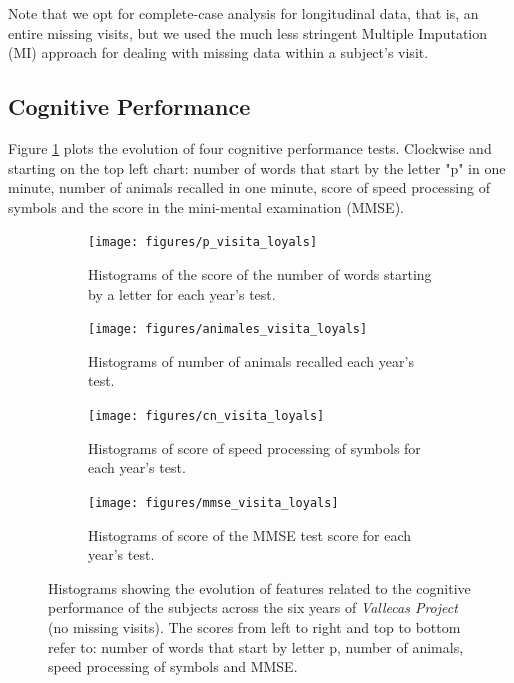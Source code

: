 \documentclass[11pt]{article}
\theoremstyle{definition}
\theoremstyle{remark}
\begin{document}
Note that we opt for complete-case analysis for longitudinal data, that is, an entire missing visits, but 
we used the much less stringent Multiple Imputation (MI) \cite{buuren2010mice} approach for dealing with missing data within a subject's visit.

\subsection{Cognitive Performance}
\label{sse:cogper}
Figure \ref{fig:cogperyears} plots the evolution of four cognitive performance tests. Clockwise and starting on  the top left chart: number of words that start by the letter "p" in one minute, number of animals recalled in one minute, score of speed processing of symbols and the score in the mini-mental examination (MMSE).

\begin{figure}[H]
    \centering
    \begin{subfigure}[t]{0.4\textwidth}
        \centering
        \texttt{[image: figures/p\_visita\_loyals]}
        \caption{Histograms of the score of the number of words starting by a letter for each year's test.}
    \end{subfigure}
    \hfill
    \begin{subfigure}[t]{0.4\textwidth}
        \centering
        \texttt{[image: figures/animales\_visita\_loyals]}
        \caption{Histograms of number of animals recalled each year's test.}
    \end{subfigure}%
    
     \begin{subfigure}[t]{0.4\textwidth}
        \centering
        \texttt{[image: figures/cn\_visita\_loyals]}
        \caption{Histograms of score of speed processing of symbols for each year's test.}
    \end{subfigure}
    \hfill
    \begin{subfigure}[t]{0.4\textwidth}
        \centering
        \texttt{[image: figures/mmse\_visita\_loyals]}
        \caption{Histograms of score of the MMSE test score for each year's test.}
    \end{subfigure}%
    \caption{Histograms showing the evolution of features related to the cognitive performance of the subjects across the six years of \emph{Vallecas Project} (no missing visits). The scores from left to right and top to bottom refer to: number of words that start by letter p, number of animals, speed processing of symbols and MMSE.}
    \label{fig:cogperyears}
\end{figure}
\end{document}
